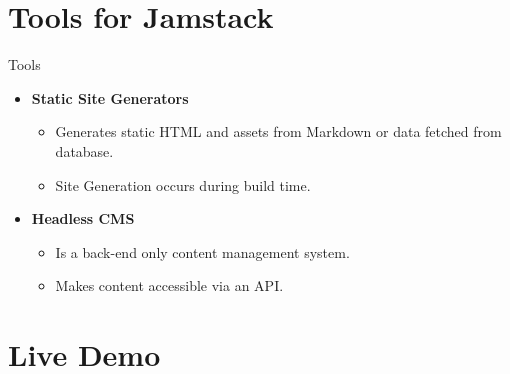 \documentclass[aspectratio=169,9pt]{beamer}
\begin{document}
\section{Tools for Jamstack}
\begin{frame}{Tools}

\begin{itemize}
    \item \textbf{Static Site Generators}
    \vspace{.5em}
    \begin{itemize}
    \setlength{\itemsep}{.4em}
        \item Generates static HTML and assets from Markdown or data fetched from database.
        \item Site Generation occurs during build time.
    \end{itemize}
    \vspace{1em}
    \item \textbf{Headless CMS}
    \vspace{.5em}
    \begin{itemize}
    \setlength{\itemsep}{.4em}
        \item Is a back-end only content management system.
        \item Makes content accessible via an API.
    \end{itemize}
\end{itemize}
    
\end{frame}

\section{Live Demo}
\end{document}
